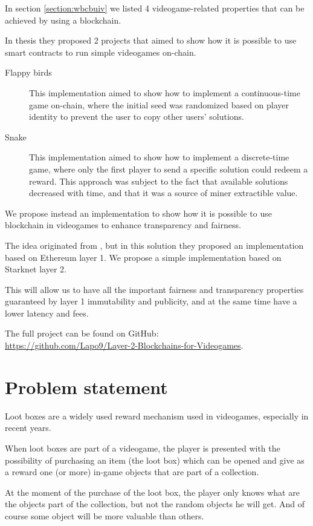 \documentclass[12pt]{article}
\begin{document}
In section \ref{section:wbcbuiv} we listed 4 videogame-related properties that can be achieved by using a blockchain.

In \cite{main_thesis} thesis they proposed 2 projects that aimed to show how it is possible to use smart contracts to run simple videogames on-chain.
\begin{description}
    \item[Flappy birds] This implementation aimed to show how to implement a continuous-time game on-chain, where the initial seed was randomized based on player identity to prevent the user to copy other users' solutions.
    \item[Snake] This implementation aimed to show how to implement a discrete-time game, where only the first player to send a specific solution could redeem a reward. This approach was subject to the fact that available solutions decreased with time, and that it was a source of miner extractible value.
\end{description}

We propose instead an implementation to show how it is possible to use blockchain in videogames to enhance transparency and fairness.

The idea originated from \cite{fair_lootboxes}, but in this solution they proposed an implementation based on Ethereum layer 1. We propose a simple implementation based on Starknet layer 2.

This will allow us to have all the important fairness and transparency properties guaranteed by layer 1 immutability and publicity, and at the same time have a lower latency and fees.

The full project can be found on GitHub:\\\url{https://github.com/Lapo9/Layer-2-Blockchains-for-Videogames}.

\section{Problem statement} \label{section:problem_statement}
Loot boxes are a widely used reward mechanism used in videogames, especially in recent years.

When loot boxes are part of a videogame, the player is presented with the possibility of purchasing an item (the loot box) which can be opened and give as a reward one (or more) in-game objects that are part of a collection.

At the moment of the purchase of the loot box, the player only knows what are the objects part of the collection, but not the random objects he will get. And of course some object will be more valuable than others.
\end{document}
